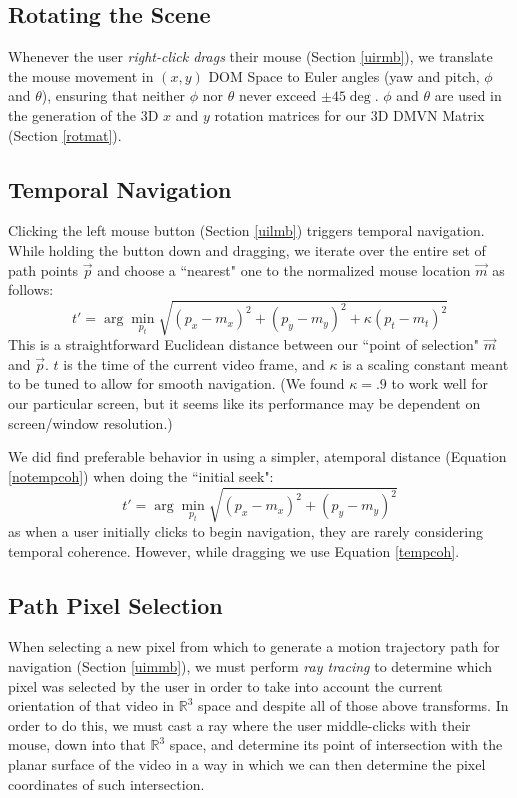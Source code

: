 \subsection{Rotating the Scene}
Whenever the user \emph{right-click drags} their mouse (Section \ref{uirmb}), we translate the mouse movement in $(x,y)$ DOM Space to Euler angles (yaw and pitch, $\phi$ and $\theta$), ensuring that neither $\phi$ nor $\theta$ never exceed $\pm45\deg$. $\phi$ and $\theta$ are used in the generation of the 3D $x$ and $y$ rotation matrices for our 3D DMVN Matrix (Section \ref{rotmat}).

\subsection{Temporal Navigation}
\label{temporalnav}
Clicking the left mouse button (Section \ref{uilmb}) triggers temporal navigation. While holding the button down and dragging, we iterate over the entire set of path points $\vec{p}$ and choose a ``nearest" one to the normalized mouse location $\vec{m}$ as follows:\cite{dmvn3d}
\begin{equation}
\label{tempcoh}
    t'= \arg \min_{p_t} \sqrt{(p_x-m_x)^2 + (p_y-m_y)^2 + \kappa (p_t - m_t)^2}
\end{equation}
This is a straightforward Euclidean distance between our ``point of selection" $\vec{m}$ and $\vec{p}$. $t$ is the time of the current video frame, and $\kappa$ is a scaling constant meant to be tuned to allow for smooth navigation. (We found $\kappa=.9$ to work well for our particular screen, but it seems like its performance may be dependent on screen/window resolution.)
\par We did find preferable behavior in using a simpler, atemporal distance (Equation \ref{notempcoh}) when doing the ``initial seek":
\begin{equation}
\label{notempcoh}
    t'= \arg \min_{p_t} \sqrt{(p_x-m_x)^2 + (p_y-m_y)^2}
\end{equation}
as when a user initially clicks to begin navigation, they are rarely considering temporal coherence. However, while dragging we use Equation \ref{tempcoh}.



\subsection{Path Pixel Selection}
\label{raytracing}
When selecting a new pixel from which to generate a motion trajectory path for navigation (Section \ref{uimmb}), we must perform \emph{ray tracing} to determine which pixel was selected by the user in order to take into account the current orientation of that video in $\mathbb{R}^3$ space and despite all of those above transforms. In order to do this, we must cast a ray where the user middle-clicks with their mouse, down into that $\mathbb{R}^3$ space, and determine its point of intersection with the planar surface of the video in a way in which we can then determine the pixel coordinates of such intersection.\par
